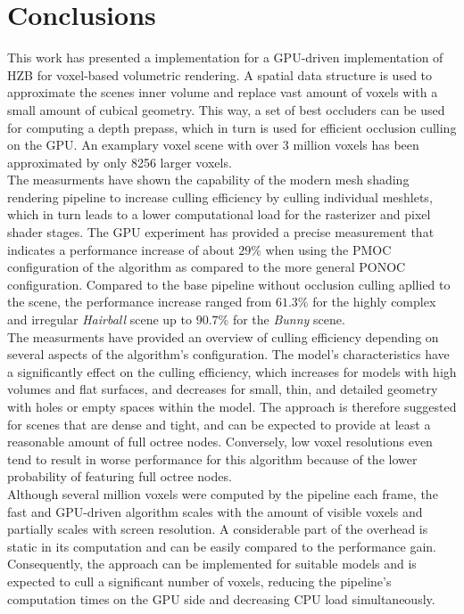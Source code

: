 \chapter{Conclusions} \label{cpt-conclusion}

This work has presented a implementation for a \ac{GPU}-driven implementation of 
\ac{HZB} for voxel-based volumetric rendering. A spatial data structure is 
used to approximate the scenes inner volume and replace vast amount of voxels 
with a small amount of cubical geometry. This way, a set of best occluders can 
be used for computing a depth prepass, which in turn is used for efficient 
occlusion culling on the \ac{GPU}. An examplary voxel scene with over 3 million 
voxels has been approximated by only 8256 larger voxels.  \\

\noindent
The measurments have shown the capability of the modern mesh shading rendering 
pipeline to increase culling efficiency by culling individual meshlets, which in 
turn leads to a lower computational load for the rasterizer and pixel shader 
stages. The \ac{GPU} experiment has provided a precise measurement that indicates a 
performance increase of about $29 \%$ when using the \ac{PMOC} configuration 
of the algorithm as compared to the more general \ac{PONOC} configuration. 
Compared to the base pipeline without occlusion culling apllied to the scene, the 
performance increase ranged from $61.3 \%$ for the highly complex and irregular 
\emph{Hairball} scene up to $90.7 \%$ for the \emph{Bunny} scene. \\

\noindent
The measurments have provided an overview of culling efficiency depending on several aspects 
of the algorithm's configuration. The model's characteristics have a significantly 
effect on the culling efficiency, which increases for models with high volumes and flat 
surfaces, and decreases for small, thin, and detailed geometry with holes or empty spaces 
within the model. The approach is therefore suggested for scenes that are dense and tight, 
and can be expected to provide at least a reasonable amount of full octree nodes. Conversely, 
low voxel resolutions even tend to result in worse performance for this algorithm because of 
the lower probability of featuring full octree nodes. \\

\noindent
Although several million voxels were computed by the pipeline each frame, the fast and 
\ac{GPU}-driven algorithm scales with the amount of visible voxels and partially scales 
with screen resolution. A considerable part of the overhead is static in its computation 
and can be easily compared to the performance gain. Consequently, the approach can be 
implemented for suitable models and is expected to cull a significant number of voxels, 
reducing the pipeline's computation times on the \ac{GPU} side and decreasing \ac{CPU} 
load simultaneously. \\

